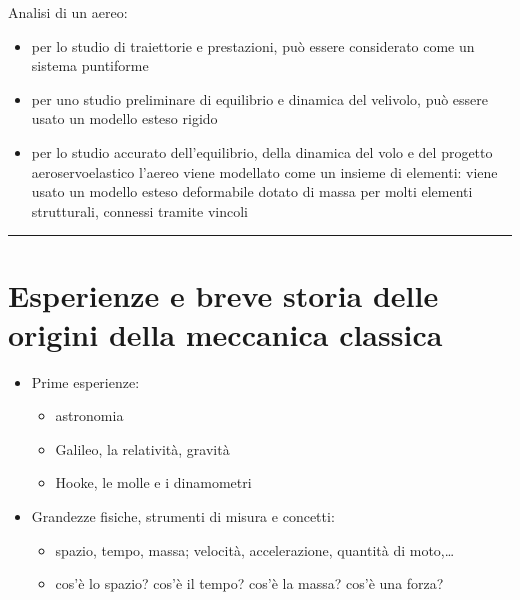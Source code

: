 \documentclass[letterpaper,10pt,italian]{jupyterBook}
\begin{document}
\sphinxAtStartPar
{} Analisi di un aereo:
\begin{itemize}
\item {} 
\sphinxAtStartPar
per lo studio di traiettorie e prestazioni, può essere considerato come un sistema puntiforme

\item {} 
\sphinxAtStartPar
per uno studio preliminare di equilibrio e dinamica del velivolo, può essere usato un modello esteso rigido

\item {} 
\sphinxAtStartPar
per lo studio accurato dell’equilibrio, della dinamica del volo e del progetto aero\sphinxhyphen{}servo\sphinxhyphen{}elastico l’aereo viene modellato come un insieme di elementi: viene usato un modello esteso deformabile dotato di massa per molti elementi strutturali, connessi tramite vincoli

\end{itemize}


\bigskip\hrule\bigskip


\sphinxstepscope


\section{Esperienze e breve storia delle origini della meccanica classica}
\label{\detokenize{ch/mechanics/intro-history:esperienze-e-breve-storia-delle-origini-della-meccanica-classica}}\label{\detokenize{ch/mechanics/intro-history:physics-hs-mechanics-intro-history}}\label{\detokenize{ch/mechanics/intro-history::doc}}\begin{itemize}
\item {} 
\sphinxAtStartPar
Prime esperienze:
\begin{itemize}
\item {} 
\sphinxAtStartPar
astronomia

\item {} 
\sphinxAtStartPar
Galileo, la relatività, gravità

\item {} 
\sphinxAtStartPar
Hooke, le molle e i dinamometri

\end{itemize}

\item {} 
\sphinxAtStartPar
Grandezze fisiche, strumenti di misura e concetti:
\begin{itemize}
\item {} 
\sphinxAtStartPar
spazio, tempo, massa; velocità, accelerazione, quantità di moto,…

\item {} 
\sphinxAtStartPar
cos’è lo spazio? cos’è il tempo? cos’è la massa? cos’è una forza?

\end{itemize}

\end{itemize}
\end{document}
